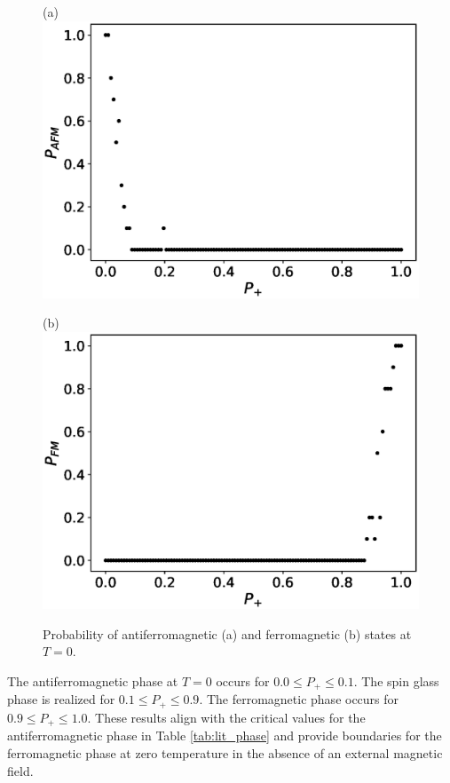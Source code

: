 \documentclass[utf8, babel, sor, jor, amsmath, amssymb, reprint]{elsarticle} %
\begin{document}
\begin{figure}[H]
	\begin{minipage}[h]{0.45\linewidth}
		\centering (a)
		\includegraphics[width=1\linewidth]{images/P_AFM_Mmax.eps}
	\end{minipage}
	\hfill
	\begin{minipage}[h]{0.45\linewidth}
		\centering (b)
		\includegraphics[width=1\linewidth]{images/P_FM_Mmax.eps}
	\end{minipage}
	\caption{Probability of antiferromagnetic (a) and ferromagnetic (b) states at \( T = 0 \).}
	\label{fig:P_AFM_FM_Mmax}
\end{figure}

The antiferromagnetic phase at $T = 0$ occurs for $0.0 \leq P_+ \leq 0.1$. The spin glass phase is realized for $0.1 \leq P_+ \leq 0.9$. The ferromagnetic phase occurs for $0.9 \leq P_+ \leq 1.0$. These results align with the critical values for the antiferromagnetic phase in Table \ref{tab:lit_phase} and provide boundaries for the ferromagnetic phase at zero temperature in the absence of an external magnetic field.
\end{document}
